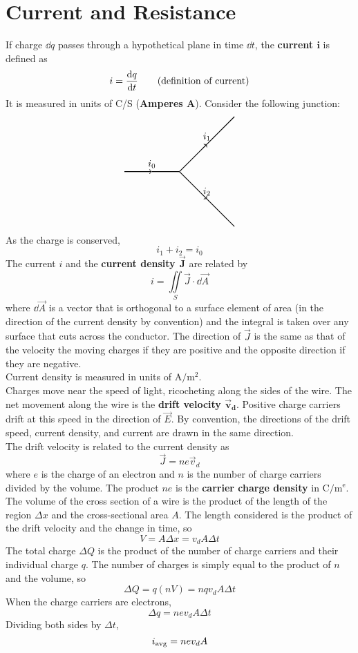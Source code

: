 \documentclass[./Electricity and Magnetism.tex]{subfiles}
\begin{document}
	\section{Current and Resistance}
		If charge \(\dd{q}\) passes through a hypothetical plane in time \(\dd{t}\), the \textbf{current \(\bm{i}\)} is defined as
			\[i = \dv{q}{t} \tag{definition of current}\]
			It is measured in units of C/S (\textbf{Amperes A}).
		Consider the following junction:
			\[\begin{tikzpicture}[scale = 2]
				\draw[thick, ->] (0, 0) -- (0.5, 0) node[above]{\(i_0\)};
				\draw[thick] (0.5, 0) -- (1, 0);
				\draw[thick, ->] (1, 0) to (1.5, 0.5) node[above]{\(i_1\)};
				\draw[thick] (1.5, 0.5) to (2, 1);
				\draw[thick, ->] (1, 0) to (1.5, -0.5) node[above]{\(i_2\)};
				\draw[thick] (1.5, -0.5) to (2, -1);
			\end{tikzpicture}\]
			As the charge is conserved,
			\[i_1 + i_2 = i_0\]
		The current \(i\) and the \textbf{current density \(\bm{\vec{J}}\)} are related by
			\[i = \iint\limits_S \vec{J} \cdot \dd{\vec{A}}\]
			where \(\dd{\vec{A}}\) is a vector that is orthogonal to a surface element of area (in the direction of the current density by convention) and the integral is taken over any surface that cuts across the conductor. The direction of \(\vec{J}\) is the same as that of the velocity the moving charges if they are positive and the opposite direction if they are negative. \\
			Current density is measured in units of \(\mathrm{A/m^2}\). \\
		Charges move near the speed of light, ricocheting along the sides of the wire. The net movement along the wire is the \textbf{drift velocity \(\bm{\vec{v}_d}\)}. Positive charge carriers drift at this speed in the direction of \(\vec{E}\). By convention, the directions of the drift speed, current density, and current are drawn in the same direction. \\
			The drift velocity is related to the current density as
			\[\vec{J} = ne\vec{v}_d\]
			where \(e\) is the charge of an electron and \(n\) is the number of charge carriers divided by the volume. The product \(ne\) is the \textbf{carrier charge density} in \(\mathrm{C/m^e}\). \\
		The volume of the cross section of a wire is the product of the length of the region \(\Delta x\) and the cross-sectional area \(A\). The length considered is the product of the drift velocity and the change in time, so
			\[
				V = A\Delta x = 
					v_dA\Delta t
			\] 
			The total charge \(\Delta Q\) is the product of the number of charge carriers and their individual charge \(q\). The number of charges is simply equal to the product of \(n\) and the volume, so
				\[
					\Delta Q = q(nV) 
						= nqv_dA\Delta t
				\]
				When the charge carriers are electrons,
				\[\Delta q = nev_dA\Delta t\]
				Dividing both sides by \(\Delta t\),
				\[i_{\text{avg}} = nev_dA\]
\end{document}
